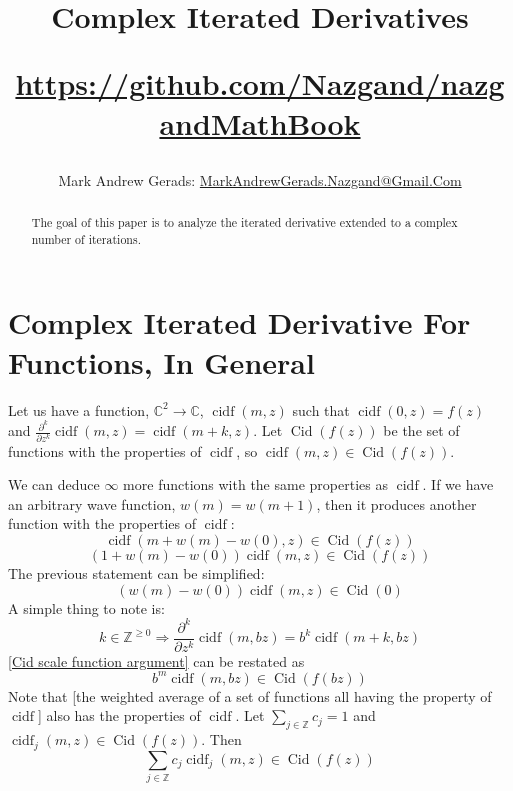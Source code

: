 \documentclass[]{article}
\author{Mark Andrew Gerads: \href{MailTo:MarkAndrewGerads.Nazgand@Gmail.Com}{MarkAndrewGerads.Nazgand@Gmail.Com}}
\title{
	Complex Iterated Derivatives
	
	\href{https://github.com/Nazgand/nazgandMathBook}{https://github.com/Nazgand/nazgandMathBook}
}
\DeclareMathOperator{\cidf}{cidf}
\DeclareMathOperator{\Cid}{Cid}
\newcommand{\pqty}[1]{{\left(#1\right)}}
\newcommand{\pdiff}[2]{\frac{\partial^{#2}}{\partial #1^{#2}}}
\numberwithin{equation}{section}
\begin{document}
	
	\maketitle
	
	\begin{abstract}
		The goal of this paper is to analyze the iterated derivative extended to a complex number of iterations.
	\end{abstract}
	
	\section{Complex Iterated Derivative For Functions, In General}
	Let us have a function, $\mathbb{C}^2\to\mathbb{C}$, $\cidf\pqty{m,z}$ such that $\cidf\pqty{0,z}=f\pqty{z}$ and $\pdiff{z}{k}\cidf\pqty{m,z}=\cidf\pqty{m+k,z}$. Let $\Cid\pqty{f\pqty{z}}$ be the set of functions with the properties of $\cidf$, so $\cidf\pqty{m,z}\in\Cid\pqty{f\pqty{z}}$.
	
	We can deduce $\infty$ more functions with the same properties as $\cidf$. 
	If we have an arbitrary wave function, $w\pqty{m}=w\pqty{m+1}$, then it produces another function with the properties of $\cidf$:
	\begin{equation}
		\cidf\pqty{m+w\pqty{m}-w\pqty{0},z}\in \Cid\pqty{f\pqty{z}}
	\end{equation}
	\begin{equation}
		\pqty{1+w\pqty{m}-w\pqty{0}}\cidf\pqty{m,z}\in \Cid\pqty{f\pqty{z}}
	\end{equation}
	The previous statement can be simplified:
	\begin{equation}
		\pqty{w\pqty{m}-w\pqty{0}}\cidf\pqty{m,z}\in \Cid\pqty{0}
	\end{equation}
	A simple thing to note is:
	\begin{equation}
		\label{Cid scale function argument}
		k\in\mathbb{Z}^{\geq 0}
		\Rightarrow
		\pdiff{z}{k}\cidf\pqty{m,bz}=b^k\cidf\pqty{m+k,bz}
	\end{equation}
	\eqref{Cid scale function argument} can be restated as
	\begin{equation}
		b^m\cidf\pqty{m,bz}\in\Cid\pqty{f\pqty{bz}}
	\end{equation}
	Note that [the weighted average of a set of functions all having the property of $\cidf$] also has the properties of $\cidf$. Let $\sum_{j\in\mathbb{Z}}c_j=1$ and $\cidf_j\pqty{m,z}\in\Cid\pqty{f\pqty{z}}$. Then
	\begin{equation}
		\sum_{j\in\mathbb{Z}}c_j \cidf_j\pqty{m,z}\in \Cid\pqty{f\pqty{z}}
	\end{equation}
	
\end{document}
